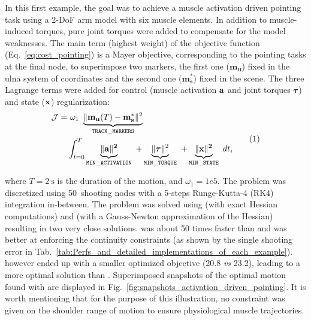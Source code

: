 %
In this first example, the goal was to achieve a muscle activation driven pointing task using a 2-DoF arm model with six muscle elements. 
In addition to muscle-induced torques, pure joint torques were added to compensate for the model weaknesses.
The main term (highest weight) of the objective function (Eq.~\ref{eq:cost_pointing}) is a Mayer objective, corresponding to the pointing tasks at the final node, to superimpose two markers, the first one ($\mathbf{m_u}$) fixed in the ulna system of coordinates and the second one ($\mathbf{m^*_s}$) fixed in the scene.
The three Lagrange terms  were added for control (muscle activation $\bf{a}$ and joint torques $\boldsymbol{\tau}$) and state ($\bf{x}$) regularization:
\[
\begin{aligned}
	\mathcal{J} = 	&~\omega_1~\underbrace{\|\mathbf{m_u}(T)-\mathbf{m^*_s}\|^2}_{\mathtt{TRACK\_MARKERS}}~\\
	&\int_{t=0}^T\underbrace{\|\bf{a}\|^2}_{\mathtt{MIN\_ACTIVATION}}~
	+\underbrace{\|\boldsymbol\tau\|^2}_{\mathtt{MIN\_TORQUE}}~
	+\underbrace{\|\bf{x}\|^2}_{\mathtt{MIN\_STATE}}~ dt,
\end{aligned}
\addtag
\label{eq:cost_pointing}
\]

\noindent where $T\!=\!\SI{2}{\second}$ is the duration of the motion, and $\omega_1\!=\!1e5$.
The problem was discretized using 50~shooting nodes with a 5-steps Runge-Kutta-4 (RK4) integration in-between.
The problem was solved using \ipopt (with exact Hessian computations) and \acados (with a Gauss-Newton approximation of the Hessian) resulting in two very close solutions.
\acados was about 50 times faster than \ipopt and was better at enforcing the continuity constraints (as shown by the single shooting error in Tab.~\ref{tab:Perfs_and_detailed_implementations_of_each_example}).
\ipopt however ended up with a smaller optimized objective (20.8 \textit{vs} 23.2), leading to a more optimal solution than \acados. 
Superimposed snapshots of the optimal motion found with \acados are displayed in Fig.~\ref{fig:snapshots_activation_driven_pointing}.
It is worth mentioning that for the purpose of this illustration, no constraint was given on the shoulder range of motion to ensure physiological muscle trajectories. 








